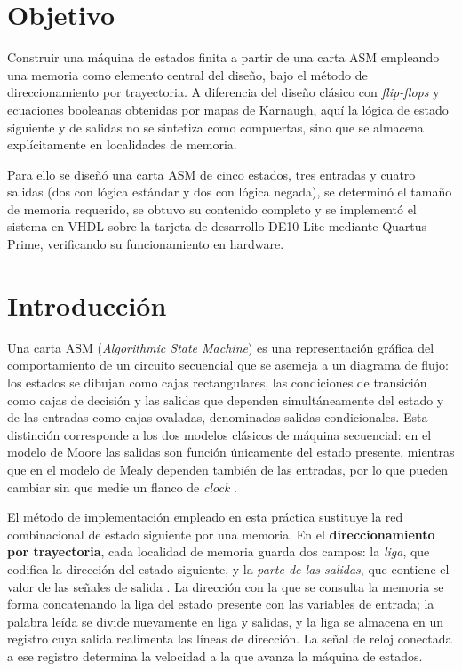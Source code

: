 \setcounter{page}{1}

\section{Objetivo}

Construir una máquina de estados finita a partir de una carta ASM empleando una memoria
como elemento central del diseño, bajo el método de direccionamiento por trayectoria. A
diferencia del diseño clásico con \textit{flip-flops} y ecuaciones booleanas obtenidas
por mapas de Karnaugh, aquí la lógica de estado siguiente y de salidas no se sintetiza
como compuertas, sino que se almacena explícitamente en localidades de memoria.

Para ello se diseñó una carta ASM de cinco estados, tres entradas y cuatro salidas (dos
con lógica estándar y dos con lógica negada), se determinó el tamaño de memoria
requerido, se obtuvo su contenido completo y se implementó el sistema en VHDL sobre la
tarjeta de desarrollo DE10-Lite mediante Quartus Prime, verificando su funcionamiento
en hardware.

\section{Introducción}

Una carta ASM (\textit{Algorithmic State Machine}) es una representación gráfica del
comportamiento de un circuito secuencial que se asemeja a un diagrama de flujo: los
estados se dibujan como cajas rectangulares, las condiciones de transición como cajas
de decisión y las salidas que dependen simultáneamente del estado y de las entradas
como cajas ovaladas, denominadas salidas condicionales. Esta distinción corresponde a
los dos modelos clásicos de máquina secuencial: en el modelo de Moore las salidas son
función únicamente del estado presente, mientras que en el modelo de Mealy dependen
también de las entradas, por lo que pueden cambiar sin que medie un flanco de
\textit{clock} \cite{mano}.

El método de implementación empleado en esta práctica sustituye la red combinacional de
estado siguiente por una memoria. En el \textbf{direccionamiento por trayectoria}, cada
localidad de memoria guarda dos campos: la \textit{liga}, que codifica la dirección del
estado siguiente, y la \textit{parte de las salidas}, que contiene el valor de las
señales de salida \cite{savage}. La dirección con la que se consulta la memoria se forma
concatenando la liga del estado presente con las variables de entrada; la palabra leída
se divide nuevamente en liga y salidas, y la liga se almacena en un registro cuya salida
realimenta las líneas de dirección. La señal de reloj conectada a ese registro determina
la velocidad a la que avanza la máquina de estados.

